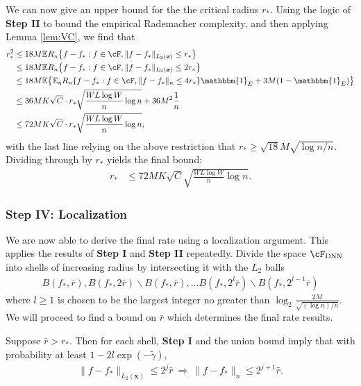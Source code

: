 \documentclass[11pt]{article}
\numberwithin{equation}{section}
\theoremstyle{definition}
\newcommand{\E}{\mathbb{E}}
\newcommand{\One}{\mathbbm{1}}
\newcommand{\bx}{\bm{x}}
\newcommand{\gt}{\tilde{\gamma}}
\begin{document}
\begin{appendices}
We can now give an upper bound for the the critical radius $r_*$. Using the logic of {\bf Step II} to bound the empirical Rademacher complexity, and then applying Lemma \ref{lem:VC}, we find that
\begin{align*}
	r_*^2 &\leq 18 M \E R_n \big\{ f - f_*: f \in \cF, \|f - f_* \|_{L_2(\bx)} \leq r_* \big\}    		\\
	& \leq 18 M \E R_n \big\{ f - f_*: f \in \cF, \|f - f_* \|_{L_2(\bx)} \leq 2r_* \big\}    		\\
	& \leq 18 M \E \big\{ \E_\eta R_n \{ f - f_*: f \in \cF, \|f - f_* \|_{n} \leq 4r_* \} \One_E + 3 M (1-\One_E)  \big\}     \\ %
	& \leq 36 M K \sqrt{C} \cdot r_*  \sqrt{ \frac{W L \log W}{n}\log n} + 36 M^2 \frac{1}{n}  		\\
	& \leq 72 M K \sqrt{C} \cdot r_*  \sqrt{ \frac{W L \log W}{n}\log n},
\end{align*}
with the last line relying on the above restriction that $r_* \geq \sqrt{18}M\sqrt{\log n/n}$. Dividing through by $r_*$ yields the final bound:
\begin{align}
	\label{eqn:r_star}
	r_* & \leq 72 M K\sqrt{C}  \sqrt{ \frac{W L \log W}{n}\log n}.
\end{align}







\subsubsection{Step IV: Localization}
	\label{appx:shells}

We are now able to derive the final rate using a localization argument. This applies the results of {\bf Step I} and {\bf Step II} repeatedly. Divide the space $\cF_{\rm DNN}$ into shells of increasing radius by intersecting it with the $L_2$ balls
\begin{align}
	B(f_*, \bar{r}), B(f_*, 2\bar{r}) \backslash B(f_*, \bar{r}), \ldots B(f_*, 2^{l} \bar{r}) \backslash B(f_*, 2^{l-1} \bar{r})
\end{align}
where $l \geq 1$ is chosen to be the largest integer no greater than $\log_2 \frac{2M}{\sqrt{(\log n)/n}}$. We will proceed to find a bound on $\bar{r}$ which determines the final rate results.


Suppose $\bar{r} > r_*$. Then for each shell, {\bf Step I} and the union bound imply that with probability at least $1 - 2 l \exp(-\gt)$, %
\begin{align}
	\| f - f_* \|_{L_2(\bx)} \leq 2^{j} \bar{r}  \ \Rightarrow  \ \| f - f_* \|_n \leq 2^{j+1} \bar{r} .
\end{align}


\end{appendices}
\end{document}
